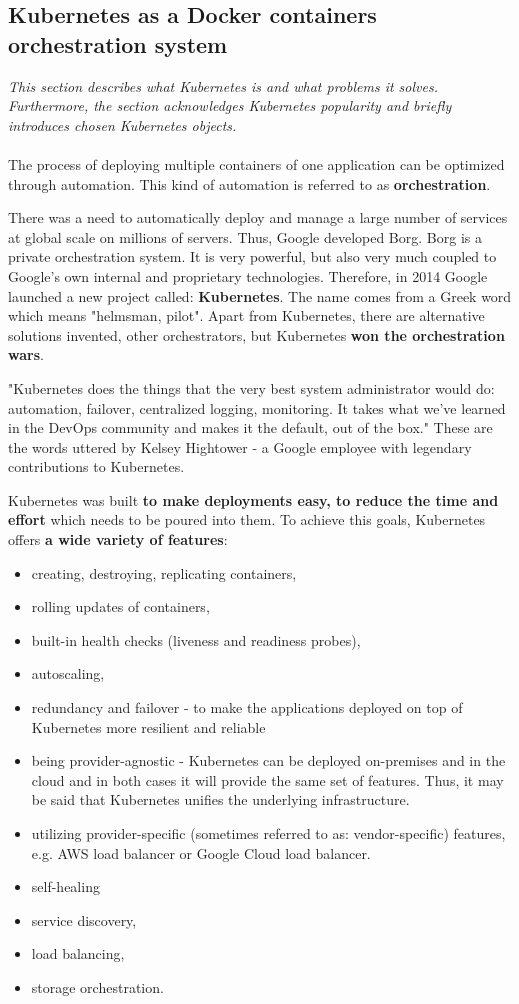 \subsection{Kubernetes as a Docker containers orchestration system}
\textit{This section describes what Kubernetes is and what problems it solves. Furthermore, the section acknowledges Kubernetes popularity and briefly introduces chosen Kubernetes objects.}
~\\
~\\
The process of deploying multiple containers of one application can be optimized through automation. This kind of automation is referred to as \textbf{orchestration}\cite{art-byza}.

There was a need to automatically deploy and manage a large number of services at global scale on millions of servers. Thus, Google developed Borg. Borg is a private orchestration system. It is very powerful, but also very much coupled to Google’s own internal and proprietary technologies. Therefore, in 2014 Google launched a new project called: \textbf{Kubernetes}. The name comes from a Greek word which means "helmsman, pilot". Apart from Kubernetes, there are alternative solutions invented, other orchestrators, but Kubernetes \textbf{won the orchestration wars}\cite{book-cndwk}\cite{article-modelling-performance-k8s}.

"Kubernetes does the things that the very best system administrator would do: automation, failover, centralized logging, monitoring. It takes what we’ve learned in the DevOps community and makes it the default, out of the box." These are the words uttered by Kelsey Hightower - a Google employee with legendary contributions to Kubernetes\cite{book-cndwk}.

Kubernetes was built \textbf{to make deployments easy, to reduce the time and effort} which needs to be poured into them. To achieve this goals, Kubernetes offers \textbf{a wide variety of features}\cite{book-cndwk}\cite{article-state-machine}\cite{k8s}:
\begin{itemize}
\item creating, destroying, replicating containers,
\item rolling updates of containers,
\item built-in health checks (liveness and readiness probes),
\item autoscaling,
\item redundancy and failover - to make the applications deployed on top of Kubernetes more resilient and reliable
\item being provider-agnostic - Kubernetes can be deployed on-premises and in the cloud and in both cases it will provide the same set of features. Thus, it may be said that Kubernetes unifies the underlying infrastructure.
\item utilizing provider-specific (sometimes referred to as: vendor-specific) features, e.g. AWS load balancer or Google Cloud load balancer.
\item self-healing
\item service discovery,
\item load balancing,
\item storage orchestration.
\end{itemize}


